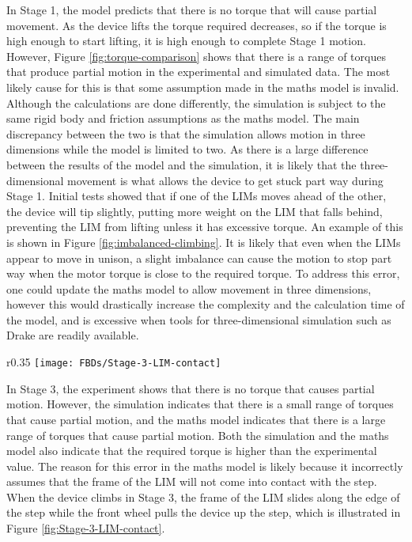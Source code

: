 In Stage 1, the model predicts that there is no torque that will cause partial movement. As the device lifts the torque required decreases, so if the torque is high enough to start lifting, it is high enough to complete Stage 1 motion. However, Figure \ref{fig:torque-comparison} shows that there is a range of torques that produce partial motion in the experimental and simulated data. The most likely cause for this is that some assumption made in the maths model is invalid. Although the calculations are done differently, the simulation is subject to the same rigid body and friction assumptions as the maths model. The main discrepancy between the two is that the simulation allows motion in three dimensions while the model is limited to two. As there is a large difference between the results of the model and the simulation, it is likely that the three-dimensional movement is what allows the device to get stuck part way during Stage 1. Initial tests showed that if one of the LIMs moves ahead of the other, the device will tip slightly, putting more weight on the LIM that falls behind, preventing the LIM from lifting unless it has excessive torque. An example of this is shown in Figure \ref{fig:imbalanced-climbing}. It is likely that even when the LIMs appear to move in unison, a slight imbalance can cause the motion to stop part way when the motor torque is close to the required torque. To address this error, one could update the maths model to allow movement in three dimensions, however this would drastically increase the complexity and the calculation time of the model, and is excessive when tools for three-dimensional simulation such as Drake are readily available.\\
\clearpage
\begin{wrapfigure}{r}{0.35\textwidth}
	\centering
	\texttt{[image: FBDs/Stage-3-LIM-contact]}
	\caption{Frame of the LIM making contact with the edge of the step in Stage 3}
	\label{fig:Stage-3-LIM-contact}
\end{wrapfigure}
In Stage 3, the experiment shows that there is no torque that causes partial motion. However, the simulation indicates that there is a small range of torques that cause partial motion, and the maths model indicates that there is a large range of torques that cause partial motion. Both the simulation and the maths model also indicate that the required torque is higher than the experimental value. The reason for this error in the maths model is likely because it incorrectly assumes that the frame of the LIM will not come into contact with the step. When the device climbs in Stage 3, the frame of the LIM slides along the edge of the step while the front wheel pulls the device up the step, which is illustrated in Figure \ref{fig:Stage-3-LIM-contact}.
